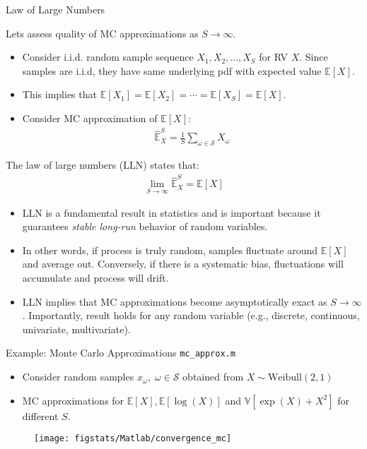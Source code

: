 \documentclass[9pt]{beamer}
\begin{document}
%
\begin{frame}{Law of Large Numbers}

Lets assess quality of MC approximations as $S\to \infty$. 
\begin{itemize}
\item Consider i.i.d. random sample sequence $X_1,X_2,...,X_S$ for RV $X$. Since samples are i.i.d, they have same underlying pdf with expected value $\mathbb{E}[X]$. 
\item This implies that $\mathbb{E}[X_1]=\mathbb{E}[X_2]=\cdots=\mathbb{E}[X_S]=\mathbb{E}[X]$. 
\item Consider MC approximation of $\mathbb{E}[X]$:
\begin{align*}
\hat{\mathbb{E}}_X^S=\frac{1}{S}\sum_{\omega \in \mathcal{S}}X_\omega
\end{align*}
\end{itemize}
\begin{block}{}
The law of large numbers (LLN) states that:
\begin{align*}
\lim_{S\to \infty}\hat{\mathbb{E}}_X^S=\mathbb{E}[X]
\end{align*}
\end{block}
\begin{itemize}
\item LLN is a fundamental result in statistics and is important because it guarantees {\em stable long-run} behavior of random variables.  

\item In other words, if process is truly random, samples fluctuate around $\mathbb{E}[X]$ and average out.  Conversely, if there is a systematic bias, fluctuations will accumulate and process will drift. 

\item LLN implies that MC approximations become asymptotically exact as $S\to \infty$. Importantly, result holds for any random variable (e.g., discrete, continuous, univariate, multivariate). 
\end{itemize}

\end{frame}

%
\begin{frame}{Example: Monte Carlo Approximations \footnotesize{\texttt{mc\_approx.m}}}

\begin{itemize}
\setlength{\itemsep}{10pt}
\item Consider random samples $x_\omega,\; \omega \in \mathcal{S}$ obtained from $X\sim \textrm{Weibull}(2,1)$
\item MC approximations for $\mathbb{E}[X],\mathbb{E}[\log(X)]$ and $\mathbb{V}[\exp(X)+X^2]$  for different $S$.
\end{itemize}
\begin{figure}[!htb]
    \centering
	\texttt{[image: figstats/Matlab/convergence\_mc]}
\end{figure}


\end{frame}
\end{document}
